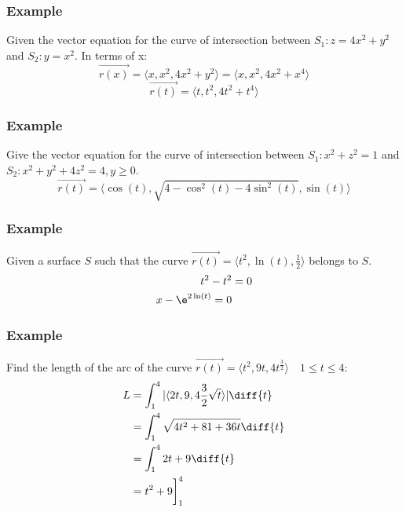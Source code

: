 \documentclass[letterpaper, 12pt]{math}
\begin{document}
\subsubsection*{Example}
Given the vector equation for the curve of intersection between
\( S_1: z = 4x^2+y^2 \) and \( S_2: y = x^2 \). In terms of x:
\[ \vec{r(x)} = \langle x,x^2,4x^2+y^2\rangle = \langle x,x^2,4x^2+x^4\rangle \]
\[ \vec{r(t)} = \langle t,t^2,4t^2+t^4\rangle \]

\subsubsection*{Example}
Give the vector equation for the curve of intersection between
\( S_1: x^2+z^2 = 1 \) and \( S_2: x^2+y^2+4z^2 = 4, y\ge0 \).
\[ \vec{r(t)} = \langle\cos(t),\sqrt{4-\cos^2(t)-4\sin^2(t)},\sin(t)\rangle \]

\subsubsection*{Example}
Given a surface \( S \) such that the curve \( \vec{r(t)} = \langle t^2,\ln(t),
\frac{1}{2}\rangle \) belongs to \( S \).
\begin{align*}
  t^2-t^2 &= 0 \\
  x-\e^{2\ln(t)} = 0
\end{align*}

\subsubsection*{Example}
Find the length of the arc of the curve \( \overrightarrow{r(t)} =
\langle t^2,9t,4t^\frac{3}{2}\rangle \quad 1\le t\le 4 \):
\begin{align*}
  L &= \int_{1}^{4}|\langle2t,9,4\frac{3}{2}\sqrt{t}\rangle|\diff{t} \\
  &= \int_{1}^{4}\sqrt{4t^2+81+36t}\diff{t} \\
  &= \int_{1}^{4}2t+9\diff{t} \\
  &= t^2+9\bigg]^{4}_{1}
\end{align*}
\end{document}

